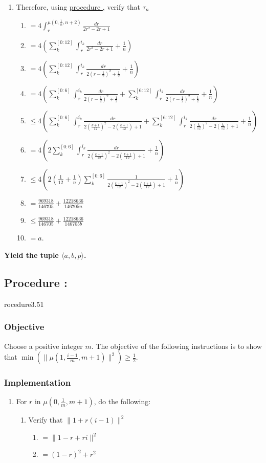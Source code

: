 \documentclass{article}
\newcounter{procedure}[part]
\newcommand{\procedure}[1]{\subsection*{Procedure \thepart:\theprocedure}\label{sec:procedure #1}\global\expandafter\edef\csname procedure#1\endcsname{\thepart:\theprocedure}\addtocounter{procedure}{1}}
\newcommand{\objective}{\subsubsection*{Objective}}
\newcommand{\implementation}{\subsubsection*{Implementation}}
\newcommand{\procedurehr}[1]{\hyperref[sec:procedure #1]{procedure \expandafter\csname procedure#1\endcsname}}
\begin{document}
\begin{multicols}{2}
\begin{enumerate}
\begin{enumerate}
\begin{enumerate}
						\end{enumerate}
						\item Therefore, using \procedurehr{3.47}, verify that $\tau_n$
						\begin{enumerate}
							\item $=4\int_r^{\mu(0,\frac{1}{n},n+2)}\frac{dr}{2r^2-2r+1}$
							\item $=4(\sum_k^{[0:{12}]}\int_r^{i_k}\frac{dr}{2r^2-2r+1}+\frac{1}{n})$
							\item $=4(\sum_k^{[0:{12}]}\int_r^{i_k}\frac{dr}{2(r-\frac{1}{2})^2+\frac{1}{2}}+\frac{1}{n})$
							\item $=4(\sum_k^{[0:{6}]}\int_r^{i_k}\frac{dr}{2(r-\frac{1}{2})^2+\frac{1}{2}}+\sum_k^{[6:{12}]}\int_r^{i_k}\frac{dr}{2(r-\frac{1}{2})^2+\frac{1}{2}}+\frac{1}{n})$
							\item $\le 4(\sum_k^{[0:{6}]}\int_r^{i_k}\frac{dr}{2(\frac{k+1}{12})^2-2(\frac{k+1}{12})+1}+\sum_k^{[6:{12}]}\int_r^{i_k}\frac{dr}{2(\frac{k}{12})^2-2(\frac{k}{12})+1}+\frac{1}{n})$
							\item $=4(2\sum_k^{[0:{6}]}\int_r^{i_k}\frac{dr}{2(\frac{k+1}{12})^2-2(\frac{k+1}{12})+1}+\frac{1}{n})$
							\item $\le 4(2(\frac{1}{12}+\frac{1}{n})\sum_k^{[0:{6}]}\frac{1}{2(\frac{k+1}{12})^2-2(\frac{k+1}{12})+1}+\frac{1}{n})$
							\item $=\frac{969318}{146705}+\frac{12218636}{146705n}$
							\item $\le\frac{969318}{146705}+\frac{12218636}{146705b}$
							\item $=a$.
						\end{enumerate}
					\end{enumerate}
					\textbf{Yield the tuple $\langle a,b,p\rangle$.}
				\end{enumerate}
		\procedure{3.51}
			\objective
				Choose a positive integer $m$. The objective of the following instructions is to show that $\min(\lVert\mu(1,\frac{i-1}{m},m+1)\rVert^2)\ge\frac{1}{2}$.
			\implementation
				\begin{enumerate}
					\item For $r$ in $\mu(0,\frac{1}{m},m+1)$, do the following:
					\begin{enumerate}
						\item Verify that $\lVert 1+r(i-1)\rVert^2$
						\begin{enumerate}
							\item $=\lVert 1-r+ri\rVert^2$
							\item $=(1-r)^2+r^2$

\end{enumerate}
\end{enumerate}
\end{enumerate}
\end{multicols}
\end{document}
